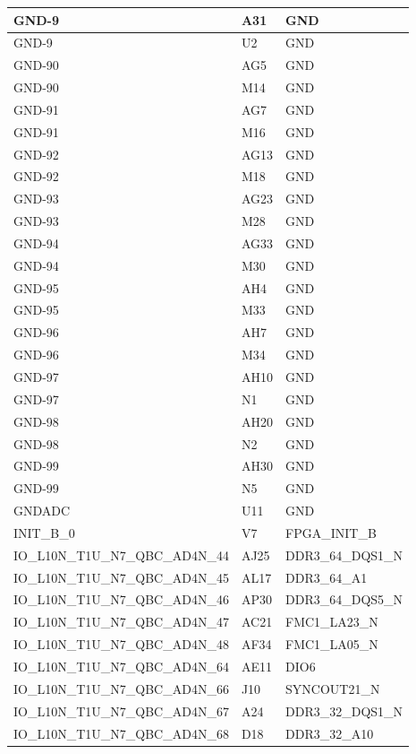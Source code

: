 \begin{footnotesize}
\begin{longtable}{|p{7cm}|p{1cm}|p{5cm}|}
GND-9	&	A31	&	GND	\\ \hline
GND-9	&	U2	&	GND	\\ \hline
GND-90	&	AG5	&	GND	\\ \hline
GND-90	&	M14	&	GND	\\ \hline
GND-91	&	AG7	&	GND	\\ \hline
GND-91	&	M16	&	GND	\\ \hline
GND-92	&	AG13	&	GND	\\ \hline
GND-92	&	M18	&	GND	\\ \hline
GND-93	&	AG23	&	GND	\\ \hline
GND-93	&	M28	&	GND	\\ \hline
GND-94	&	AG33	&	GND	\\ \hline
GND-94	&	M30	&	GND	\\ \hline
GND-95	&	AH4	&	GND	\\ \hline
GND-95	&	M33	&	GND	\\ \hline
GND-96	&	AH7	&	GND	\\ \hline
GND-96	&	M34	&	GND	\\ \hline
GND-97	&	AH10	&	GND	\\ \hline
GND-97	&	N1	&	GND	\\ \hline
GND-98	&	AH20	&	GND	\\ \hline
GND-98	&	N2	&	GND	\\ \hline
GND-99	&	AH30	&	GND	\\ \hline
GND-99	&	N5	&	GND	\\ \hline
GNDADC	&	U11	&	GND	\\ \hline
INIT\_B\_0	&	V7	&	FPGA\_INIT\_B	\\ \hline
IO\_L10N\_T1U\_N7\_QBC\_AD4N\_44	&	AJ25	&	DDR3\_64\_DQS1\_N	\\ \hline
IO\_L10N\_T1U\_N7\_QBC\_AD4N\_45	&	AL17	&	DDR3\_64\_A1	\\ \hline
IO\_L10N\_T1U\_N7\_QBC\_AD4N\_46	&	AP30	&	DDR3\_64\_DQS5\_N	\\ \hline
IO\_L10N\_T1U\_N7\_QBC\_AD4N\_47	&	AC21	&	FMC1\_LA23\_N	\\ \hline
IO\_L10N\_T1U\_N7\_QBC\_AD4N\_48	&	AF34	&	FMC1\_LA05\_N	\\ \hline
IO\_L10N\_T1U\_N7\_QBC\_AD4N\_64	&	AE11	&	DIO6	\\ \hline
IO\_L10N\_T1U\_N7\_QBC\_AD4N\_66	&	J10	&	SYNCOUT21\_N	\\ \hline
IO\_L10N\_T1U\_N7\_QBC\_AD4N\_67	&	A24	&	DDR3\_32\_DQS1\_N	\\ \hline
IO\_L10N\_T1U\_N7\_QBC\_AD4N\_68	&	D18	&	DDR3\_32\_A10	\\ \hline

\end{longtable}
\end{footnotesize}
